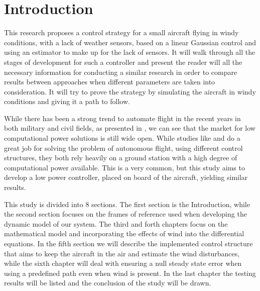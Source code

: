 \documentclass[twocolumn,showpacs,
    nofootinbib,aps,superscriptaddress,
    eqsecnum,prd,showkeys,10pt,floatfix]{revtex4}
\begin{document}
\section{Introduction}
This research proposes a control strategy for a small aircraft flying in windy
conditions, with a lack of weather sensors, based on a linear Gaussian control
and using an estimator to make up for the lack of sensors. It will walk through
all the stages of development for such a controller and present the reader will
all the necessary information for conducting a similar research in order to
compare results between approaches when different parameters are taken into
consideration. It will try to prove the strategy by simulating the aircraft in
windy conditions and giving it a path to follow.
\par
While there has been a strong trend to automate flight in the recent years in
both military and civil fields, as presented in {{\cite{lessons}}}, we can see
that the market for low computational power solutions is still wide open. While
studies like {{\cite{Gain_Scheduled}}} and {{\cite{UTC}}} do a great job for
solving the problem of autonomous flight, using different control structures,
they both rely heavily on a ground station with a high degree of computational
power available. This is a very common, but this study aims to develop a low
power controller, placed on board of the aircraft, yielding similar results.
\par
This study is divided into 8 sections. The first section is the Introduction,
while the second section focuses on the frames of reference used when
developing the dynamic model of our system. The third and forth chapters focus
on the mathematical model and incorporating the effects of wind into the
differential equations. In the fifth section we will describe the implemented
control structure that aims to keep the aircraft in the air and estimate the
wind disturbances, while the sixth chapter will deal with ensuring a null
steady state error when using a predefined path even when wind is present. In
the last chapter the testing results will be listed and the conclusion of the
study will be drawn.

\end{document}
